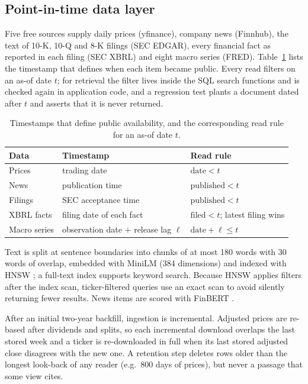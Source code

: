 \documentclass[preprint,11pt]{elsarticle}
\begin{document}
\subsection{Point-in-time data layer}
\label{sec:data}

Five free sources supply daily prices (yfinance), company news (Finnhub), the text of 10-K, 10-Q and 8-K
filings (SEC EDGAR), every financial fact as reported in each filing (SEC XBRL) and eight macro series
(FRED). Table~\ref{tab:pit} lists the timestamp that defines when each item became public. Every read
filters on an as-of date $t$; for retrieval the filter lives inside the SQL search functions and is checked
again in application code, and a regression test plants a document dated after $t$ and asserts that it is
never returned.

\begin{table}[t]
\centering\small
\caption{Timestamps that define public availability, and the corresponding read rule for an as-of date $t$.}
\label{tab:pit}
\begin{tabular}{@{}lll@{}}
\toprule
Data & Timestamp & Read rule \\
\midrule
Prices & trading date & $\text{date} < t$ \\
News & publication time & $\text{published} < t$ \\
Filings & SEC acceptance time & $\text{published} < t$ \\
XBRL facts & filing date of each fact & $\text{filed} < t$; latest filing wins \\
Macro series & observation date $+$ release lag $\ell$ & $\text{date} + \ell \le t$ \\
\bottomrule
\end{tabular}
\end{table}

Text is split at sentence boundaries into chunks of at most 180 words with 30 words of overlap, embedded
with MiniLM \cite{wang2020minilm} (384 dimensions) and indexed with HNSW \cite{malkov2016efficient}; a
full-text index supports keyword search. Because HNSW applies filters after the index scan, ticker-filtered
queries use an exact scan to avoid silently returning fewer results. News items are scored with FinBERT
\cite{araci2019finbert}.

After an initial two-year backfill, ingestion is incremental. Adjusted prices are re-based after dividends
and splits, so each incremental download overlaps the last stored week and a ticker is re-downloaded in full
when its last stored adjusted close disagrees with the new one. A retention step deletes rows older than the
longest look-back of any reader (e.g.\ 800 days of prices), but never a passage that some view cites.
\end{document}
